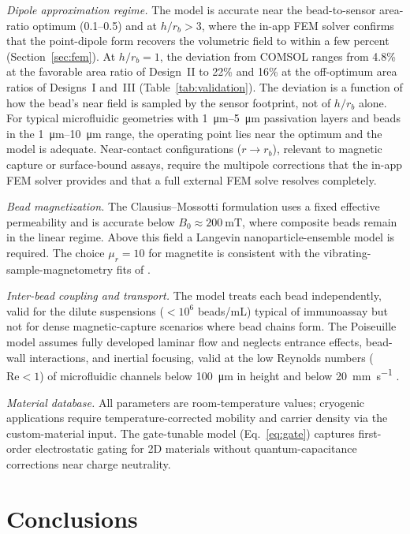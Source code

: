 \documentclass[pdflatex,sn-basic]{sn-jnl}
\theoremstyle{thmstyleone}
\theoremstyle{thmstyletwo}
\theoremstyle{thmstylethree}
\begin{document}
\textit{Dipole approximation regime.} The model is accurate near the bead-to-sensor area-ratio optimum (0.1--0.5) and at $h/r_b > 3$, where the in-app FEM solver confirms that the point-dipole form recovers the volumetric field to within a few percent (Section~\ref{sec:fem}). At $h/r_b = 1$, the deviation from COMSOL ranges from 4.8\% at the favorable area ratio of Design~II to 22\% and 16\% at the off-optimum area ratios of Designs~I and~III (Table~\ref{tab:validation}). The deviation is a function of how the bead's near field is sampled by the sensor footprint, not of $h/r_b$ alone. For typical microfluidic geometries with \SIrange{1}{5}{\micro\meter} passivation layers and beads in the \SIrange{1}{10}{\micro\meter} range, the operating point lies near the optimum and the model is adequate. Near-contact configurations ($r \to r_b$), relevant to magnetic capture or surface-bound assays, require the multipole corrections that the in-app FEM solver provides and that a full external FEM solve resolves completely.

\textit{Bead magnetization.} The Clausius--Mossotti formulation uses a fixed effective permeability and is accurate below $B_0 \approx \SI{200}{\milli\tesla}$, where composite beads remain in the linear regime. Above this field a Langevin nanoparticle-ensemble model is required. The choice $\mu_r = 10$ for magnetite is consistent with the vibrating-sample-magnetometry fits of \citet{ota2019}.

\textit{Inter-bead coupling and transport.} The model treats each bead independently, valid for the dilute suspensions ($< 10^6$ beads/mL) typical of immunoassay but not for dense magnetic-capture scenarios where bead chains form. The Poiseuille model assumes fully developed laminar flow and neglects entrance effects, bead-wall interactions, and inertial focusing, valid at the low Reynolds numbers ($\text{Re} < 1$) of microfluidic channels below \SI{100}{\micro\meter} in height and below \SI{20}{\milli\meter\per\second} \citep{hewlin2023}.

\textit{Material database.} All parameters are room-temperature values; cryogenic applications require temperature-corrected mobility and carrier density via the custom-material input. The gate-tunable model (Eq.~\eqref{eq:gate}) captures first-order electrostatic gating for 2D materials without quantum-capacitance corrections near charge neutrality.

\section{Conclusions}\label{sec:conclusions}
\end{document}
